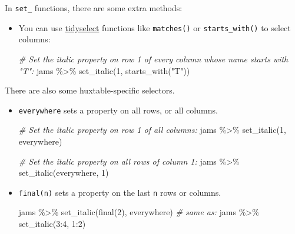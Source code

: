 \documentclass[
]{article}
\newenvironment{Shaded}{\begin{snugshade}}{\end{snugshade}}
\newcommand{\CommentTok}[1]{\textcolor[rgb]{0.56,0.35,0.01}{\textit{#1}}}
\newcommand{\DecValTok}[1]{\textcolor[rgb]{0.00,0.00,0.81}{#1}}
\newcommand{\FunctionTok}[1]{\textcolor[rgb]{0.00,0.00,0.00}{#1}}
\newcommand{\NormalTok}[1]{#1}
\newcommand{\SpecialCharTok}[1]{\textcolor[rgb]{0.00,0.00,0.00}{#1}}
\newcommand{\StringTok}[1]{\textcolor[rgb]{0.31,0.60,0.02}{#1}}
\begin{document}
\FloatBarrier

In \texttt{set\_} functions, there are some extra methods:

\begin{itemize}
\item
  You can use
  \href{https://r4ds.had.co.nz/transform.html\#select}{tidyselect}
  functions like \texttt{matches()} or \texttt{starts\_with()} to select
  columns:

\begin{Shaded}
\begin{Highlighting}[]
\CommentTok{\# Set the italic property on row 1 of every column whose name starts with "T":}
\NormalTok{jams }\SpecialCharTok{\%\textgreater{}\%} 
      \FunctionTok{set\_italic}\NormalTok{(}\DecValTok{1}\NormalTok{, }\FunctionTok{starts\_with}\NormalTok{(}\StringTok{"T"}\NormalTok{))}
\end{Highlighting}
\end{Shaded}

  \FloatBarrier
\end{itemize}

There are also some huxtable-specific selectors.

\begin{itemize}
\item
  \texttt{everywhere} sets a property on all rows, or all columns.

\begin{Shaded}
\begin{Highlighting}[]
\CommentTok{\# Set the italic property on row 1 of all columns:}
\NormalTok{jams }\SpecialCharTok{\%\textgreater{}\%} \FunctionTok{set\_italic}\NormalTok{(}\DecValTok{1}\NormalTok{, everywhere)}

\CommentTok{\# Set the italic property on all rows of column 1:}
\NormalTok{jams }\SpecialCharTok{\%\textgreater{}\%} \FunctionTok{set\_italic}\NormalTok{(everywhere, }\DecValTok{1}\NormalTok{)}
\end{Highlighting}
\end{Shaded}

  \FloatBarrier
\item
  \texttt{final(n)} sets a property on the last \texttt{n} rows or
  columns.

\begin{Shaded}
\begin{Highlighting}[]
\NormalTok{jams }\SpecialCharTok{\%\textgreater{}\%} \FunctionTok{set\_italic}\NormalTok{(}\FunctionTok{final}\NormalTok{(}\DecValTok{2}\NormalTok{), everywhere)}
\CommentTok{\# same as:}
\NormalTok{jams }\SpecialCharTok{\%\textgreater{}\%} \FunctionTok{set\_italic}\NormalTok{(}\DecValTok{3}\SpecialCharTok{:}\DecValTok{4}\NormalTok{, }\DecValTok{1}\SpecialCharTok{:}\DecValTok{2}\NormalTok{)}
\end{Highlighting}
\end{Shaded}

  \FloatBarrier
\end{itemize}
\end{document}
